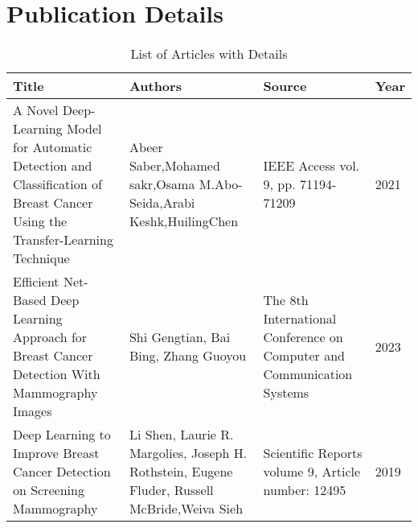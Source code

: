 \documentclass[12]{article}
\begin{document}
\section{ Publication Details}
\begin{table}[!ht]
\centering
\caption{List of Articles with Details}
\label{tab:result_analysis}
\begin{tabular}{||p{2.5cm}|p{4cm}|p{3cm}|p{2cm}||}
\hline
\textbf{Title} & \textbf{Authors} & \textbf{Source} & \textbf{Year} \\ 
\hline\hline
A Novel Deep-Learning Model for Automatic Detection and Classification of Breast Cancer
Using the Transfer-Learning Technique
 & Abeer Saber,Mohamed sakr,Osama M.Abo-Seida,Arabi Keshk,HuilingChen
 & IEEE Access vol. 9, pp. 71194-71209
 & 2021 \\ 
\hline
Efficient Net-Based Deep Learning Approach for
Breast Cancer Detection With Mammography Images
 & Shi Gengtian, Bai Bing, Zhang Guoyou
 & The 8th International Conference on Computer and Communication Systems
 & 2023 \\ 
\hline
 Deep Learning to Improve Breast 
Cancer Detection on Screening 
Mammography
& Li Shen, Laurie R. Margolies, Joseph H. Rothstein, Eugene Fluder, Russell
McBride,Weiva Sieh& Scientific Reports volume 9, Article number: 12495
 & 2019 \\ 
\hline
\end{tabular}
\end{table}
\end{document}
